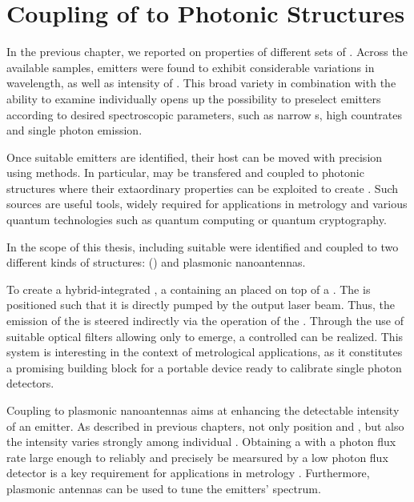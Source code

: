 
\chapter{Coupling of \Nds to Photonic Structures}	\label{ch::coupling}

	In the previous chapter, we reported on \pl properties of different sets of \sivs.
	Across the available samples, emitters were found to exhibit considerable variations in wavelength, \lw as well as intensity of \zpls.
	This broad variety in combination with the ability to examine \sivs individually opens up the possibility to preselect emitters according to desired spectroscopic parameters, such as narrow \lw{}s, high countrates and single photon emission.

	Once suitable emitters are identified, their host \nds can be moved with precision using \pp methods.
	In particular, \sivs may be transfered and coupled to photonic structures where their extaordinary properties can be exploited to create \sps.
	Such sources are useful tools, widely required for applications in metrology and various quantum technologies such as quantum computing or quantum cryptography.

	In the scope of this thesis, \nds including suitable \sivs were identified and coupled to two different kinds of structures: \Vcsels (\VCSELs) and plasmonic nanoantennas.

	To create a hybrid-integrated \sps, a \nd containing an \siv placed on top of a \VCSEL. The \siv is positioned such that it is directly pumped by the \VCSEL output laser beam. Thus, the emission of the \siv is steered indirectly via the operation of the \VCSEL. Through the use of suitable optical filters allowing only \siv \fl to emerge, a controlled \sps can be realized. This system is interesting in the context of metrological applications, as it constitutes a promising building block for a portable device ready to calibrate single photon detectors.

	Coupling \sivs to plasmonic nanoantennas aims at enhancing the detectable \pl intensity of an emitter.
	As described in previous chapters, not only \ZPL position and \lw, but also the \pl intensity varies strongly among individual \sivs.
	Obtaining a \sps with a photon flux rate large enough to reliably and precisely be mearsured by a low photon flux detector is a key requirement for applications in metrology \cite{Vaigu2017}.
	Furthermore, plasmonic antennas can be used to tune the emitters' \pl spectrum.




